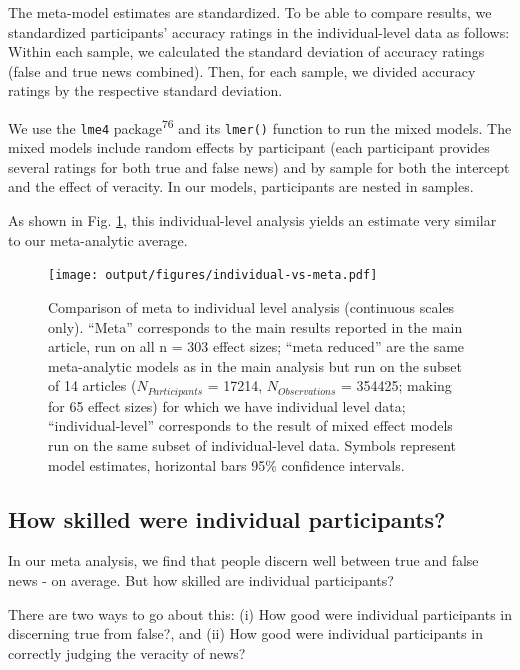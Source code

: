 \documentclass[
  man]{apa6}
\begin{document}
The meta-model estimates are standardized. To be able to compare results, we standardized participants' accuracy ratings in the individual-level data as follows: Within each sample, we calculated the standard deviation of accuracy ratings (false and true news combined). Then, for each sample, we divided accuracy ratings by the respective standard deviation.

We use the \texttt{lme4} package\textsuperscript{76} and its \texttt{lmer()} function to run the mixed models. The mixed models include random effects by participant (each participant provides several ratings for both true and false news) and by sample for both the intercept and the effect of veracity. In our models, participants are nested in samples.

As shown in Fig. \ref{fig:individual-vs-meta}, this individual-level analysis yields an estimate very similar to our meta-analytic average.



\begin{figure}
\centering
\texttt{[image: output/figures/individual-vs-meta.pdf]}
\caption{\label{fig:individual-vs-meta}Comparison of meta to individual level analysis (continuous scales only). ``Meta'' corresponds to the main results reported in the main article, run on all n = 303 effect sizes; ``meta reduced'' are the same meta-analytic models as in the main analysis but run on the subset of 14 articles (\(N_{Participants}\) = 17214, \(N_{Observations}\) = 354425; making for 65 effect sizes) for which we have individual level data; ``individual-level'' corresponds to the result of mixed effect models run on the same subset of individual-level data. Symbols represent model estimates, horizontal bars 95\% confidence intervals.}
\end{figure}

\subsection{How skilled were individual participants?}\label{how-skilled-were-individual-participants}

In our meta analysis, we find that people discern well between true and false news - on average. But how skilled are individual participants?

There are two ways to go about this: (i) How good were individual participants in discerning true from false?, and (ii) How good were individual participants in correctly judging the veracity of news?
\end{document}
